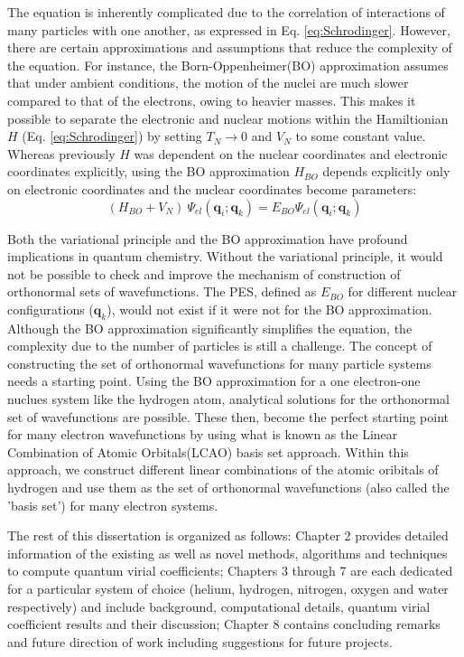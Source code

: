        The \Schrodinger{} equation is inherently complicated due to the correlation of interactions of many particles with one another, as expressed in Eq. \eqref{eq:Schrodinger}. However, there are certain approximations and assumptions that reduce the complexity of the equation. For instance, the Born-Oppenheimer(BO) approximation assumes that under ambient conditions, the motion of the nuclei are much slower compared to that of the electrons, owing to heavier masses. This makes it possible to separate the electronic and nuclear motions within the Hamiltionian $H$ (Eq. \eqref{eq:Schrodinger}) by setting $T_N \to 0$ and $V_N$ to some constant value. Whereas previously $H$ was dependent on the nuclear coordinates and electronic coordinates explicitly, using the BO approximation $H_{BO}$ depends explicitly only on electronic coordinates and the nuclear coordinates become parameters:
        \begin{equation}\label{eq:BO approximation}
            (H_{BO} + V_N)~\Psi_{el} (\mathbf{q}_i;\mathbf{q}_k) = E_{BO} \Psi_{el} (\mathbf{q}_i;\mathbf{q}_k)
        \end{equation}

        Both the variational principle and the BO approximation have profound implications in quantum chemistry. Without the variational principle, it would not be possible to check and improve the mechanism of construction of orthonormal sets of wavefunctions. The PES, defined as $E_{BO}$ for different nuclear configurations ($\mathbf{q}_k$), would not exist if it were not for the BO approximation. Although the BO approximation significantly simplifies the \Schrodinger{} equation, the complexity due to the number of particles is still a challenge. The concept of constructing the set of orthonormal wavefunctions for many particle systems needs a starting point. Using the BO approximation for a one electron-one nuclues system like the hydrogen atom, analytical solutions for the orthonormal set of wavefunctions are possible. These then, become the perfect starting point for many electron wavefunctions by using what is known as the Linear Combination of Atomic Orbitals(LCAO) basis set approach. Within this approach, we construct different linear combinations of the atomic oribitals of hydrogen and use them as the set of orthonormal wavefunctions (also called the 'basis set') for many electron systems.


        The rest of this dissertation is organized as follows: Chapter 2 provides detailed information of the existing as well as novel methods, algorithms and techniques to compute quantum virial coefficients; Chapters 3 through 7 are each dedicated for a particular system of choice (helium, hydrogen, nitrogen, oxygen and water respectively) and include background, computational details, quantum virial coefficient results and their discussion; Chapter 8 contains concluding remarks and future direction of work including suggestions for future projects. 

